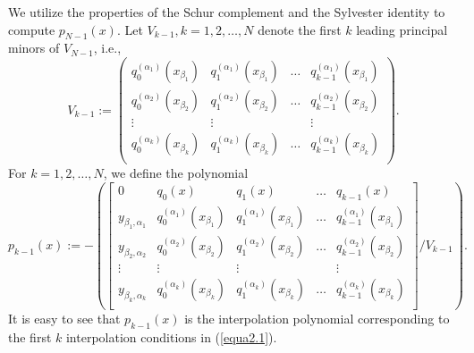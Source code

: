 \documentclass[preprint,12pt]{elsarticle}
\begin{document}
We utilize the properties of the Schur complement and the Sylvester identity to compute $p_{N-1}(x)$. Let $V_{k-1}, k=1,2,\dots,N$ denote the first $k$ leading principal minors of $V_{N-1}$, i.e.,
\begin{equation*}
V_{k-1}:=\left(
                \begin{array}{ccccc}
                  q_0^{(\alpha_1)}(x_{\beta_1}) & q_1^{(\alpha_1)}(x_{\beta_1}) & \dots & q_{k-1}^{(\alpha_1)}(x_{\beta_1}) \\
                  q_0^{(\alpha_2)}(x_{\beta_2}) & q_1^{(\alpha_2)}(x_{\beta_2}) & \dots & q_{k-1}^{(\alpha_2)}(x_{\beta_2}) \\
                  \vdots & \vdots & ~ & \vdots \\
                  q_0^{(\alpha_k)}(x_{\beta_k}) & q_1^{(\alpha_k)}(x_{\beta_k}) & \dots & q_{k-1}^{(\alpha_k)}(x_{\beta_k}) \\
                \end{array}
              \right).
\end{equation*}
For  $k=1,2,\dots,N$, we define the polynomial
\begin{equation}\label{equa3.2}
p_{k-1}(x):=-\left(\left[\begin{array}{c|cccc}
           0 & q_0(x) & q_1(x) & \dots & q_{k-1}(x) \\ \hline
           y_{\beta_1, \alpha_1} & q_0^{(\alpha_1)}(x_{\beta_1}) & q_1^{(\alpha_1)}(x_{\beta_1}) & \dots & q_{k-1}^{(\alpha_1)}(x_{\beta_1}) \\
            y_{\beta_2, \alpha_2} & q_0^{(\alpha_2)}(x_{\beta_2}) & q_1^{(\alpha_2)}(x_{\beta_2}) & \dots & q_{k-1}^{(\alpha_2)}(x_{\beta_2}) \\
            \vdots & \vdots & \vdots & ~ & \vdots \\
            y_{\beta_k, \alpha_k} & q_0^{(\alpha_k)}(x_{\beta_k}) & q_1^{(\alpha_k)}(x_{\beta_k}) & \dots & q_{k-1}^{(\alpha_k)}(x_{\beta_k}) \\
         \end{array}\right]/V_{k-1}\right).
\end{equation}
It is easy to see that $p_{k-1}(x)$ is the interpolation polynomial corresponding to the first $k$ interpolation conditions in  (\ref{equa2.1}).
\end{document}
